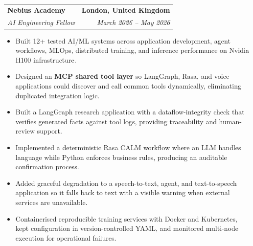 \documentclass[a4paper,10pt]{article}
\makeatletter
\newcommand{\resumeItem}[1]{
  \item\small{{#1 \vspace{-2pt}}}
}
\newcommand{\resumeSubheading}[4]{
  \vspace{-2pt}\item
    \begin{tabular*}{1.0\textwidth}[t]{l@{\extracolsep{\fill}}r}
      \textbf{#1} & \textbf{\small #2} \\
      \textit{\small #3} & \textit{\small #4} \\
    \end{tabular*}\vspace{-4pt}
}
\newcommand{\resumeItemListStart}{\begin{itemize}[leftmargin=0.2in]}
\newcommand{\resumeItemListEnd}{\end{itemize}\vspace{0pt}}
\makeatother
\begin{document}
  \resumeSubheading
    {Nebius Academy}{London, United Kingdom}
    {AI Engineering Fellow}{March 2026 -- May 2026}
  \resumeItemListStart
    \resumeItem{Built 12+ tested AI/ML systems across application development, agent workflows, MLOps, distributed training, and inference performance on Nvidia H100 infrastructure.}
    \resumeItem{Designed an \textbf{MCP shared tool layer} so LangGraph, Rasa, and voice applications could discover and call common tools dynamically, eliminating duplicated integration logic.}
    \resumeItem{Built a LangGraph research application with a dataflow-integrity check that verifies generated facts against tool logs, providing traceability and human-review support.}
    \resumeItem{Implemented a deterministic Rasa CALM workflow where an LLM handles language while Python enforces business rules, producing an auditable confirmation process.}
    \resumeItem{Added graceful degradation to a speech-to-text, agent, and text-to-speech application so it falls back to text with a visible warning when external services are unavailable.}
    \resumeItem{Containerised reproducible training services with Docker and Kubernetes, kept configuration in version-controlled YAML, and monitored multi-node execution for operational failures.}
  \resumeItemListEnd
\end{document}
